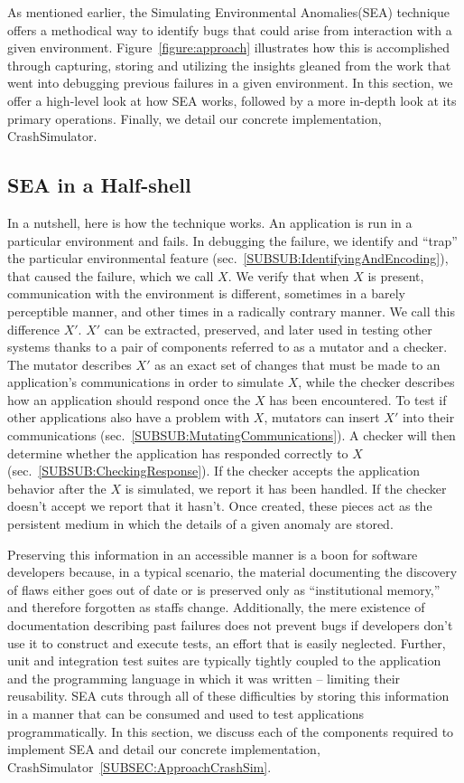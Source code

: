 As mentioned earlier,
the Simulating Environmental Anomalies(SEA) technique
offers a methodical way to identify bugs that could arise from interaction
with a given environment.
Figure~\ref{figure:approach} illustrates
how this is accomplished through
capturing, storing and utilizing the insights gleaned from the work that
went into debugging previous failures in a given environment.
In this section, we offer a high-level look at how SEA works, followed by
a more in-depth look at its primary operations.
Finally, we detail our concrete implementation, CrashSimulator.

\subsection{SEA in a Half-shell}
\label{SEC:SEAHalfshell}
In a nutshell,
here is how the technique works.
An application is run
in a particular environment and fails.
In debugging the failure,
we identify and ``trap'' the particular environmental feature
(sec.~\ref{SUBSUB:IdentifyingAndEncoding}),
that caused the failure,  which we call $X$.
We verify that when $X$ is present,
communication with the
environment is different,
sometimes in a barely perceptible manner,
and other times in a radically contrary manner.
We call this difference $X'$.
$X'$ can be extracted, preserved,
and later used in testing other systems
thanks to a pair of components referred to as a mutator and a checker.
The mutator describes $X'$ as an exact set of changes
that must be made to an application's communications
in order to simulate $X$,
while the checker describes how an
application should respond once the $X$ has been encountered.
To test if other applications also have a problem with $X$,
mutators can insert $X'$ into their
communications (sec.~\ref{SUBSUB:MutatingCommunications}).
A checker will then determine whether the
application has responded correctly to
$X$(sec.~\ref{SUBSUB:CheckingResponse}).
If the checker accepts the application behavior
after the $X$ is simulated,
we report it has been handled.
If the checker doesn't accept we report that it hasn't.
Once created,
these pieces act as the persistent medium in which the details of
a given anomaly are stored.

Preserving this information in an accessible manner
is a boon for software developers because,
in a typical scenario, the material documenting
the discovery of flaws
either goes out of date or
is preserved only as ``institutional memory,''
and therefore forgotten as staffs change.
Additionally,
the mere existence of documentation
describing past failures
does not prevent bugs
if developers don't use it
to construct and execute tests,
an effort that is easily neglected.
Further, unit and integration test suites
are typically tightly coupled
to the application and the programming language in which it was written --
limiting their reusability.
SEA cuts through all of these difficulties by
storing this information in a manner that can be consumed
and used to test applications programmatically.
In this section, we discuss each of the components
required to implement SEA
and detail our concrete implementation,
CrashSimulator~\ref{SUBSEC:ApproachCrashSim}.

